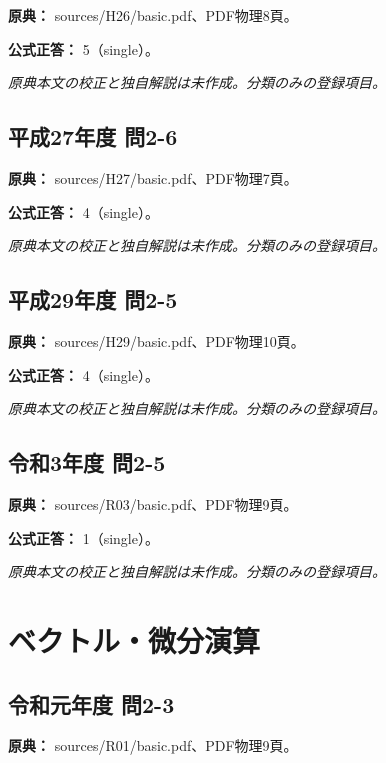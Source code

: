 \noindent\textbf{原典：} sources/H26/basic.pdf、PDF物理8頁。

\textbf{公式正答：} 5（single）。

\par\textit{原典本文の校正と独自解説は未作成。分類のみの登録項目。}

\subsection{平成27年度 問2-6}
\label{q:h27-reg-basic-2-6}

\noindent\textbf{原典：} sources/H27/basic.pdf、PDF物理7頁。

\textbf{公式正答：} 4（single）。

\par\textit{原典本文の校正と独自解説は未作成。分類のみの登録項目。}

\subsection{平成29年度 問2-5}
\label{q:h29-reg-basic-2-5}

\noindent\textbf{原典：} sources/H29/basic.pdf、PDF物理10頁。

\textbf{公式正答：} 4（single）。

\par\textit{原典本文の校正と独自解説は未作成。分類のみの登録項目。}

\subsection{令和3年度 問2-5}
\label{q:r03-reg-basic-2-5}

\noindent\textbf{原典：} sources/R03/basic.pdf、PDF物理9頁。

\textbf{公式正答：} 1（single）。

\par\textit{原典本文の校正と独自解説は未作成。分類のみの登録項目。}

\section{ベクトル・微分演算}

\subsection{令和元年度 問2-3}
\label{q:r01-reg-basic-2-3}

\noindent\textbf{原典：} sources/R01/basic.pdf、PDF物理9頁。

